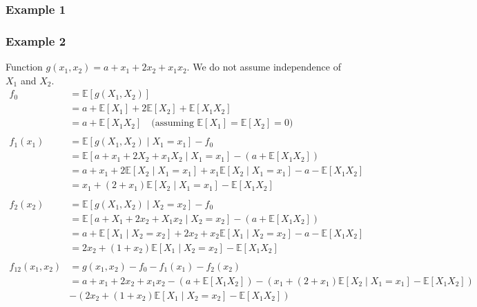 \subsubsection*{Example 1}

\subsubsection*{Example 2}
Function $g(x_1, x_2) = a + x_1 + 2x_2 + x_1x_2$. We do not assume independence of $X_1$ and $X_2$.
\begin{align*}
    f_0 &= \mathbb{E}[g(X_1, X_2)] \\
        &= a + \mathbb{E}[X_1] + 2\mathbb{E}[X_2] + \mathbb{E}[X_1X_2] \\
        &= a + \mathbb{E}[X_1X_2] \quad \text{(assuming } \mathbb{E}[X_1] = \mathbb{E}[X_2] = 0\text{)} \\
    \\
    f_1(x_1) &= \mathbb{E}[g(X_1, X_2) \mid X_1 = x_1] - f_0 \\
            &= \mathbb{E}[a + x_1 + 2X_2 + x_1X_2 \mid X_1 = x_1] - (a + \mathbb{E}[X_1X_2]) \\
            &= a + x_1 + 2\mathbb{E}[X_2 \mid X_1 = x_1] + x_1\mathbb{E}[X_2 \mid X_1 = x_1] - a - \mathbb{E}[X_1X_2] \\
            &= x_1 + (2 + x_1)\mathbb{E}[X_2 \mid X_1 = x_1] - \mathbb{E}[X_1X_2] \\
    \\
    f_2(x_2) &= \mathbb{E}[g(X_1, X_2) \mid X_2 = x_2] - f_0 \\
            &= \mathbb{E}[a + X_1 + 2x_2 + X_1x_2 \mid X_2 = x_2] - (a + \mathbb{E}[X_1X_2]) \\
            &= a + \mathbb{E}[X_1 \mid X_2 = x_2] + 2x_2 + x_2 \mathbb{E}[X_1 \mid X_2 = x_2] - a - \mathbb{E}[X_1X_2] \\
            &= 2x_2 + (1 + x_2)\mathbb{E}[X_1 \mid X_2 = x_2]  - \mathbb{E}[X_1X_2] \\
    \\
    f_{12}(x_1, x_2) &= g(x_1, x_2) - f_0 - f_1(x_1) - f_2(x_2) \\
            &= a + x_1 + 2x_2 + x_1x_2 - \left( a + \mathbb{E}[X_1X_2] \right) - \left( x_1 + (2 + x_1)\mathbb{E}[X_2 \mid X_1 = x_1] - \mathbb{E}[X_1X_2] \right) \\
            &- \left( 2x_2 + (1 + x_2)\mathbb{E}[X_1 \mid X_2 = x_2] - \mathbb{E}[X_1X_2] \right)
\end{align*}


